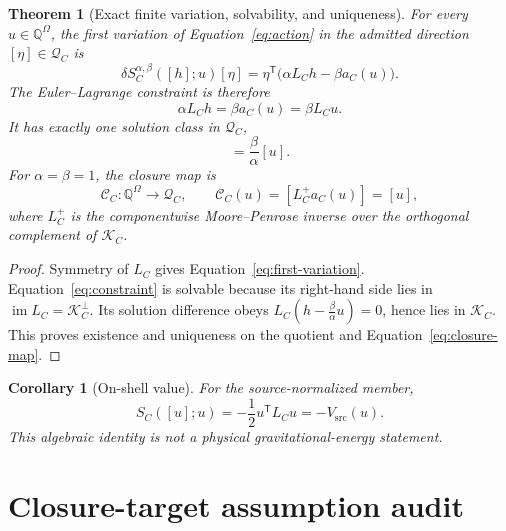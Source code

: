 \documentclass[11pt]{article}
\newtheorem{theorem}{Theorem}
\newtheorem{corollary}{Corollary}
\newcommand{\Q}{\mathbb Q}
\newcommand{\Qspace}{\mathcal Q_C}
\newcommand{\Kspace}{\mathcal K_C}
\newcommand{\Sclosure}{S_C}
\begin{document}
\begin{theorem}[Exact finite variation, solvability, and uniqueness]
\label{thm:closure}
For every \(u\in\Q^\Omega\), the first variation of
Equation~\eqref{eq:action} in the admitted direction
\([\eta]\in\Qspace\) is
\begin{equation}
 \delta\Sclosure^{\alpha,\beta}([h];u)[\eta]
 =\eta^{\mathsf T}\bigl(\alpha L_Ch-\beta a_C(u)\bigr).
 \label{eq:first-variation}
\end{equation}
The Euler--Lagrange constraint is therefore
\begin{equation}
 \alpha L_Ch=\beta a_C(u)=\beta L_Cu.
 \label{eq:constraint}
\end{equation}
It has exactly one solution class in \(\Qspace\),
\begin{equation}
 [h]=\frac{\beta}{\alpha}[u].
 \label{eq:solution}
\end{equation}
For \(\alpha=\beta=1\), the closure map is
\begin{equation}
 \mathcal C_C:\Q^\Omega\longrightarrow\Qspace,
 \qquad
 \mathcal C_C(u)=[L_C^+a_C(u)]=[u],
 \label{eq:closure-map}
\end{equation}
where \(L_C^+\) is the componentwise Moore--Penrose inverse over the
orthogonal complement of \(\Kspace\).
\end{theorem}

\begin{proof}
Symmetry of \(L_C\) gives Equation~\eqref{eq:first-variation}.
Equation~\eqref{eq:constraint} is solvable because its right-hand side lies
in \(\operatorname{im}L_C=\Kspace^\perp\).  Its solution difference obeys
\(L_C(h-\frac{\beta}{\alpha}u)=0\), hence lies in \(\Kspace\).
This proves existence and uniqueness on the quotient and
Equation~\eqref{eq:closure-map}.
\end{proof}

\begin{corollary}[On-shell value]
For the source-normalized member,
\begin{equation}
 \Sclosure([u];u)
 =-\frac12u^{\mathsf T}L_Cu
 =-V_{\mathrm{src}}(u).
 \label{eq:on-shell}
\end{equation}
This algebraic identity is not a physical gravitational-energy statement.
\end{corollary}

\section{Closure-target assumption audit}
\end{document}
